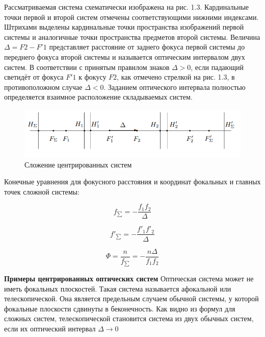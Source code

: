 \documentclass[15pt,a5paper,reqno]{article}
\begin{document}
Рассматриваемая система схематически изображена на рис. 1.3.
Кардинальные точки первой и второй систем отмечены соответствующими нижними индексами. Штрихами выделены кардинальные точки
пространства изображений первой системы и аналогичные точки пространства предметов второй системы. 
Величина $\Delta = F2 - F′1$ представляет расстояние от заднего фокуса первой системы до переднего фокуса
второй системы и называется оптическим интервалом двух систем. 
В соответствии с принятым правилом знаков $\Delta > 0$, если падающий светидёт от фокуса $F′1$ к фокусу $F2$, как отмечено стрелкой на рис. 1.3, в
противоположном случае $\Delta < 0$. Заданием оптического интервала полностью определяется взаимное расположение складываемых систем.

\begin{figure}[h!]
    \centering
    \includegraphics[width=0.8\linewidth]{pics/system_of_lens.png}
    \caption{Сложение центрированных систем}
    \label{}
\end{figure}


Конечные уравнения для фокусного расстояния и координат фокальных и главных точек сложной системы:


\begin{equation}\label{1}
    f_{\sum} = - \frac{f_1 f_2}{\Delta}
\end{equation}


\begin{equation}\label{2}
    f'_{\sum } = - \frac{f'_1 f'_2}{\Delta}
\end{equation}

\begin{equation}\label{3}
    \Phi = \frac{n}{f_{\sum}} = -\frac{n\Delta}{f_1 f_2}
\end{equation}



\textbf{Примеры центрированных оптических систем}
Оптическая система может не иметь фокальных плоскостей. Такая система называется афокальной или телескопической.
Она является предельным случаем обычной системы, у которой фокальные плоскости сдвинуты в беконечность.
Как видно из формул для сложных систем, телескопической становится система из двух обычных систем, если их оптический интервал $\Delta \rightarrow 0$
\end{document}
